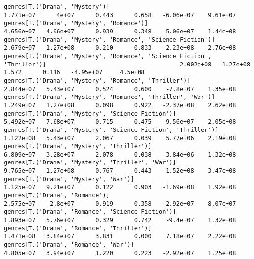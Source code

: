 \documentclass[11pt]{article}
\begin{document}
\begin{Verbatim}[commandchars=\\\{\}]
genres[T.('Drama', 'Mystery')]                                                                                1.771e+07      4e+07      0.443      0.658   -6.06e+07    9.61e+07
genres[T.('Drama', 'Mystery', 'Romance')]                                                                     4.656e+07   4.96e+07      0.939      0.348   -5.06e+07    1.44e+08
genres[T.('Drama', 'Mystery', 'Romance', 'Science Fiction')]                                                  2.679e+07   1.27e+08      0.210      0.833   -2.23e+08    2.76e+08
genres[T.('Drama', 'Mystery', 'Romance', 'Science Fiction', 'Thriller')]                                      2.002e+08   1.27e+08      1.572      0.116   -4.95e+07     4.5e+08
genres[T.('Drama', 'Mystery', 'Romance', 'Thriller')]                                                         2.844e+07   5.43e+07      0.524      0.600    -7.8e+07    1.35e+08
genres[T.('Drama', 'Mystery', 'Romance', 'Thriller', 'War')]                                                  1.249e+07   1.27e+08      0.098      0.922   -2.37e+08    2.62e+08
genres[T.('Drama', 'Mystery', 'Science Fiction')]                                                             5.492e+07   7.68e+07      0.715      0.475   -9.56e+07    2.05e+08
genres[T.('Drama', 'Mystery', 'Science Fiction', 'Thriller')]                                                 1.122e+08   5.43e+07      2.067      0.039    5.77e+06    2.19e+08
genres[T.('Drama', 'Mystery', 'Thriller')]                                                                    6.809e+07   3.28e+07      2.078      0.038    3.84e+06    1.32e+08
genres[T.('Drama', 'Mystery', 'Thriller', 'War')]                                                             9.765e+07   1.27e+08      0.767      0.443   -1.52e+08    3.47e+08
genres[T.('Drama', 'Mystery', 'War')]                                                                         1.125e+07   9.21e+07      0.122      0.903   -1.69e+08    1.92e+08
genres[T.('Drama', 'Romance')]                                                                                2.575e+07    2.8e+07      0.919      0.358   -2.92e+07    8.07e+07
genres[T.('Drama', 'Romance', 'Science Fiction')]                                                             1.893e+07   5.76e+07      0.329      0.742    -9.4e+07    1.32e+08
genres[T.('Drama', 'Romance', 'Thriller')]                                                                    1.471e+08   3.84e+07      3.831      0.000    7.18e+07    2.22e+08
genres[T.('Drama', 'Romance', 'War')]                                                                         4.805e+07   3.94e+07      1.220      0.223   -2.92e+07    1.25e+08

\end{Verbatim}
\end{document}
